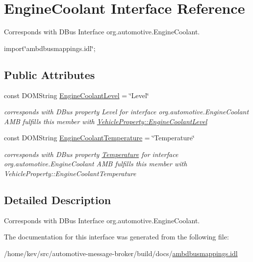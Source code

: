 \hypertarget{interfaceEngineCoolant}{\section{Engine\+Coolant Interface Reference}
\label{interfaceEngineCoolant}
}


Corresponds with D\+Bus Interface org.\+automotive.\+Engine\+Coolant.  




{\ttfamily import\char`\"{}ambdbusmappings.\+idl\char`\"{};}

\subsection*{Public Attributes}
\begin{DoxyCompactItemize}
\item 
\hypertarget{interfaceEngineCoolant_a7245fb937d72b4799fbe6379252f1fda}{const D\+O\+M\+String \hyperlink{interfaceEngineCoolant_a7245fb937d72b4799fbe6379252f1fda}{Engine\+Coolant\+Level} = \char`\"{}Level\char`\"{}}\label{interfaceEngineCoolant_a7245fb937d72b4799fbe6379252f1fda}

\begin{DoxyCompactList}\small\item\em corresponds with D\+Bus property Level for interface org.\+automotive.\+Engine\+Coolant A\+M\+B fulfills this member with \hyperlink{classVehicleProperty_aac38e43b1c1ec7239252dfafe6d19d87}{Vehicle\+Property\+::\+Engine\+Coolant\+Level} \end{DoxyCompactList}\item 
\hypertarget{interfaceEngineCoolant_a561d51436c678300a5c433ea947d489a}{const D\+O\+M\+String \hyperlink{interfaceEngineCoolant_a561d51436c678300a5c433ea947d489a}{Engine\+Coolant\+Temperature} = \char`\"{}Temperature\char`\"{}}\label{interfaceEngineCoolant_a561d51436c678300a5c433ea947d489a}

\begin{DoxyCompactList}\small\item\em corresponds with D\+Bus property \hyperlink{interfaceTemperature}{Temperature} for interface org.\+automotive.\+Engine\+Coolant A\+M\+B fulfills this member with Vehicle\+Property\+::\+Engine\+Coolant\+Temperature \end{DoxyCompactList}\end{DoxyCompactItemize}


\subsection{Detailed Description}
Corresponds with D\+Bus Interface org.\+automotive.\+Engine\+Coolant. 

The documentation for this interface was generated from the following file\+:\begin{DoxyCompactItemize}
\item 
/home/kev/src/automotive-\/message-\/broker/build/docs/\hyperlink{ambdbusmappings_8idl}{ambdbusmappings.\+idl}\end{DoxyCompactItemize}
